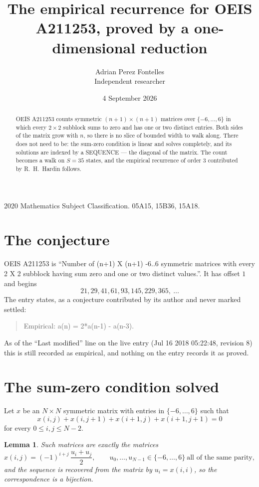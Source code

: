 \documentclass[11pt,a4paper]{article}
\title{The empirical recurrence for OEIS A211253, proved by a one-dimensional reduction}
\author{Adrian Perez Fontelles\\ \small Independent researcher}
\date{4 September 2026}
\theoremstyle{plain}
\newtheorem{lemma}[theorem]{Lemma}
\theoremstyle{definition}
\begin{document}
\maketitle

\begin{abstract}
OEIS A211253 counts symmetric $(n+1)\times(n+1)$ matrices over
$\{-6,\dots,6\}$ in which every $2\times2$ subblock sums to zero and has one or two distinct
entries. Both sides of the matrix grow with $n$, so there is no slice of bounded width to walk
along. There does not need to be: the sum-zero condition is linear and solves completely, and
its solutions are indexed by a SEQUENCE --- the diagonal of the matrix. The count becomes a walk
on $S=35$ states, and the empirical recurrence of order $3$ contributed by R.~H.~Hardin
follows.
\end{abstract}

\noindent\small 2020 Mathematics Subject Classification. 05A15, 15B36, 15A18.\normalsize

\section{The conjecture}

OEIS A211253 is ``Number of (n+1) X (n+1) -6..6 symmetric matrices with every 2 X 2 subblock having sum zero and one or two distinct values.''. It has offset $1$ and begins
\[
21, 29, 41, 61, 93, 145, 229, 365,\ \dots
\]
The entry states, as a conjecture contributed by its author and never marked settled:
\begin{quote}
Empirical: a(n) = 2*a(n-1) - a(n-3).
\end{quote}
As of the ``Last modified'' line on the live entry (Jul 16 2018 05:22:48, revision 8) this is still
recorded as empirical, and nothing on the entry records it as proved.

\section{The sum-zero condition solved}

Let $x$ be an $N\times N$ symmetric matrix with entries in $\{-6,\dots,6\}$ such that
\[
x(i,j)+x(i,j{+}1)+x(i{+}1,j)+x(i{+}1,j{+}1)=0
\]
for every $0\le i,j\le N-2$.

\begin{lemma}\label{lem:solve}
Such matrices are exactly the matrices
\[
x(i,j)=(-1)^{i+j}\,\frac{u_i+u_j}{2},
\qquad u_0,\dots,u_{N-1}\in\{-6,\dots,6\}\ \text{all of the same parity},
\]
and the sequence is recovered from the matrix by $u_i=x(i,i)$, so the correspondence is a
bijection.
\end{lemma}
\end{document}
